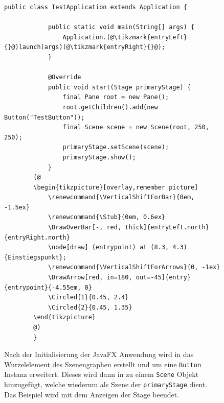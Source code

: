 \begin{figure}[H]
	\begin{lstlisting}[caption={Beispiel -- Minimale JavaFX-Anwendung.}, captionpos=b, label=lst:example_javafxapp]
		public class TestApplication extends Application {
			
			public static void main(String[] args) {
				Application.(@\tikzmark{entryLeft}{}@)launch(args)(@\tikzmark{entryRight}{}@);
			}
			
			@Override
			public void start(Stage primaryStage) {
				final Pane root = new Pane();
				root.getChildren().add(new Button("TestButton"));
				final Scene scene = new Scene(root, 250, 250);
				primaryStage.setScene(scene);
				primaryStage.show();
			}
		(@
		\begin{tikzpicture}[overlay,remember picture]
			\renewcommand{\VerticalShiftForBar}{0em, -1.5ex}
			\renewcommand{\Stub}{0em, 0.6ex}
			\DrawOverBar[-, red, thick]{entryLeft.north}{entryRight.north}
			\node[draw] (entrypoint) at (8.3, 4.3) {Einstiegspunkt};
			\renewcommand{\VerticalShiftForArrows}{0, -1ex}
			\DrawArrow[red, in=180, out=-45]{entry}{entrypoint}{-4.55em, 0}
			\Circled{1}{0.45, 2.4}
			\Circled{2}{0.45, 1.35}
		\end{tikzpicture}
		@)
		}
	\end{lstlisting}
	Nach der Initialisierung der JavaFX Anwendung wird in  das Wurzelelement des Szenengraphen erstellt und um eine \texttt{Button} Instanz erweitert. Dieses wird dann in  zu einem \texttt{Scene} Objekt hinzugefügt, welche wiederum als Szene der \texttt{primaryStage} dient. Das Beispiel wird mit dem Anzeigen der Stage beendet.
\end{figure}
